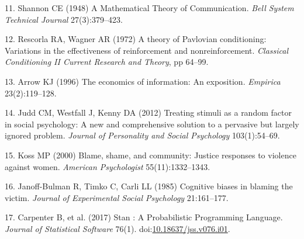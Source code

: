 \documentclass[9pt,twocolumn,twoside,lineno]{pnas-new}
\begin{document}
\hypertarget{ref-Shannon1948}{}
11. Shannon CE (1948) A Mathematical Theory of Communication. \emph{Bell
System Technical Journal} 27(3):379--423.

\hypertarget{ref-Rescorla1972}{}
12. Rescorla RA, Wagner AR (1972) A theory of Pavlovian conditioning:
Variations in the effectiveness of reinforcement and nonreinforcement.
\emph{Classical Conditioning II Current Research and Theory}, pp 64--99.

\hypertarget{ref-Arrow1996}{}
13. Arrow KJ (1996) The economics of information: An exposition.
\emph{Empirica} 23(2):119--128.

\hypertarget{ref-Judd2012}{}
14. Judd CM, Westfall J, Kenny DA (2012) Treating stimuli as a random
factor in social psychology: A new and comprehensive solution to a
pervasive but largely ignored problem. \emph{Journal of Personality and
Social Psychology} 103(1):54--69.

\hypertarget{ref-Koss2000}{}
15. Koss MP (2000) Blame, shame, and community: Justice responses to
violence against women. \emph{American Psychologist} 55(11):1332--1343.

\hypertarget{ref-Janoff-bulman1985}{}
16. Janoff-Bulman R, Timko C, Carli LL (1985) Cognitive biases in
blaming the victim. \emph{Journal of Experimental Social Psychology}
21:161--177.

\hypertarget{ref-Carpenter2017}{}
17. Carpenter B, et al. (2017) Stan : A Probabilistic Programming
Language. \emph{Journal of Statistical Software} 76(1).
doi:\href{https://doi.org/10.18637/jss.v076.i01}{10.18637/jss.v076.i01}.



% 
\end{document}
